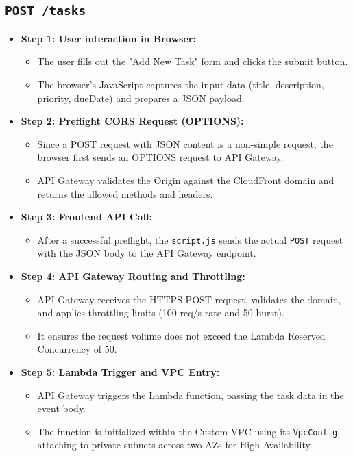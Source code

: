 \subsection{\texttt{POST /tasks}}
\begin{itemize}
  \item \textbf{Step 1: User interaction in Browser:}
  \begin{itemize}
    \item The user fills out the "Add New Task" form and clicks the submit button.
    \item The browser's JavaScript captures the input data (title, description, priority, dueDate) and prepares a JSON payload.
  \end{itemize}
  \item \textbf{Step 2: Preflight CORS Request (OPTIONS):}
  \begin{itemize}
    \item Since a POST request with JSON content is a non-simple request, the browser first sends an OPTIONS request to API Gateway.
    \item API Gateway validates the Origin against the CloudFront domain and returns the allowed methods and headers.
  \end{itemize}
  \item \textbf{Step 3: Frontend API Call:}
  \begin{itemize}
    \item After a successful preflight, the \texttt{script.js} sends the actual \texttt{POST} request with the JSON body to the API Gateway endpoint.
  \end{itemize}
  \item \textbf{Step 4: API Gateway Routing and Throttling:}
  \begin{itemize}
    \item API Gateway receives the HTTPS POST request, validates the domain, and applies throttling limits (100 req/s rate and 50 burst).
    \item It ensures the request volume does not exceed the Lambda Reserved Concurrency of 50.
  \end{itemize}
  \item \textbf{Step 5: Lambda Trigger and VPC Entry:}
  \begin{itemize}
    \item API Gateway triggers the Lambda function, passing the task data in the event body.
    \item The function is initialized within the Custom VPC using its \texttt{VpcConfig}, attaching to private subnets across two AZs for High Availability.

\end{itemize}
\end{itemize}
